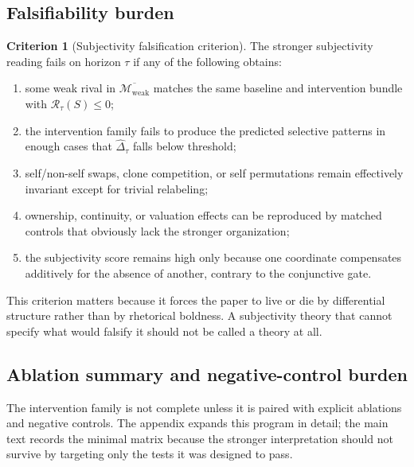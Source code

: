 \documentclass[11pt,a4paper]{article}
\theoremstyle{definition}
\newtheorem{criterion}[theorem]{Criterion}
\newcommand{\WeakFam}{\mathcal{M}_{\mathrm{weak}}}
\newcommand{\WeakClosure}{\overline{\WeakFam}}
\newcommand{\IntervProf}{\Delta}
\newcommand{\Irred}{\mathcal{R}}
\begin{document}
\subsection{Falsifiability burden}
\begin{criterion}[Subjectivity falsification criterion]
The stronger subjectivity reading fails on horizon $\tau$ if any of the following obtains:
\begin{enumerate}[leftmargin=1.5em]
\item some weak rival in $\WeakClosure$ matches the same baseline and intervention bundle with $\Irred_\tau(S)\le 0$;
\item the intervention family fails to produce the predicted selective patterns in enough cases that $\widehat{\IntervProf}_\tau$ falls below threshold;
\item self/non-self swaps, clone competition, or self permutations remain effectively invariant except for trivial relabeling;
\item ownership, continuity, or valuation effects can be reproduced by matched controls that obviously lack the stronger organization;
\item the subjectivity score remains high only because one coordinate compensates additively for the absence of another, contrary to the conjunctive gate.
\end{enumerate}
\end{criterion}

This criterion matters because it forces the paper to live or die by differential structure rather than by rhetorical boldness. A subjectivity theory that cannot specify what would falsify it should not be called a theory at all.

\subsection{Ablation summary and negative-control burden}
The intervention family is not complete unless it is paired with explicit ablations and negative controls. The appendix expands this program in detail; the main text records the minimal matrix because the stronger interpretation should not survive by targeting only the tests it was designed to pass.
\end{document}
